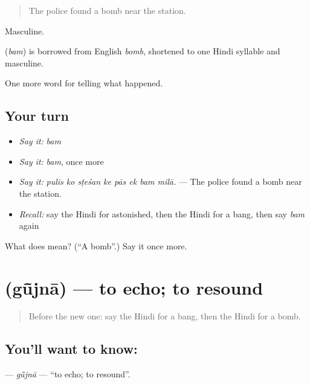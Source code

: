 \begin{quote}
The police found a bomb near the station.
\end{quote}

Masculine.

\begin{cousinweb}
\textbf{} (\emph{bam}) is borrowed from English \emph{bomb}, shortened to one Hindi syllable and masculine.
\end{cousinweb}

\begin{grammarlens}[title={What you've built}]
One more word for telling what happened.
\end{grammarlens}

\subsection*{Your turn}
\begin{itemize}
\raggedright
  \item \emph{Say it:} \emph{bam}
  \item \emph{Say it:} \emph{bam}, once more
  \item \emph{Say it:} \emph{pulis ko sṭeśan ke pās ek bam milā.} — The police found a bomb near the station.
  \item \emph{Recall:} say the Hindi for astonished, then the Hindi for a bang, then say \emph{bam} again
\end{itemize}

\begin{tcolorbox}[breakable,colback=teal!4,colframe=teal!35!black,title={Before you move on}]
What does  mean? (\textquotedblleft{}A bomb\textquotedblright{}.) Say it once more.
\end{tcolorbox}
\section[\texorpdfstring{\hi{गूँजना} (gū̃jnā)}{गूँजना (gū̃jnā)}]{ (gū̃jnā) — to echo; to resound}

\label{lesson:HI-C318-gujna}



\begin{quote}
Before the new one: say the Hindi for a bang, then the Hindi for a bomb.
\end{quote}

\subsection*{You'll want to know: }
\textbf{} — \emph{gū̃jnā} — \textquotedblleft{}to echo; to resound\textquotedblright{}.


